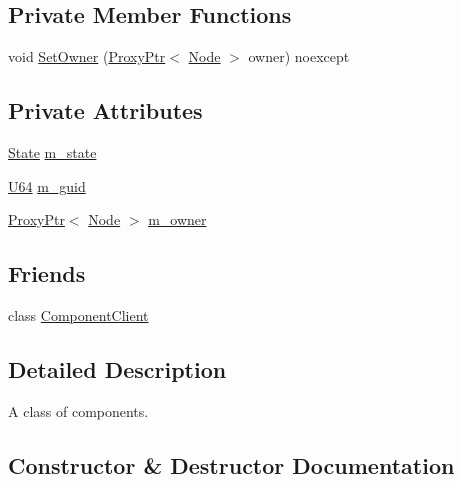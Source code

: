 \subsection*{Private Member Functions}
\begin{DoxyCompactItemize}
\item 
void \hyperlink{classmage_1_1_component_aed5c7f7af79357f708c71572d7d99638}{Set\+Owner} (\hyperlink{classmage_1_1_proxy_ptr}{Proxy\+Ptr}$<$ \hyperlink{classmage_1_1_node}{Node} $>$ owner) noexcept
\end{DoxyCompactItemize}
\subsection*{Private Attributes}
\begin{DoxyCompactItemize}
\item 
\hyperlink{namespacemage_ae47d13d8477ee94893b9a3947d28eebc}{State} \hyperlink{classmage_1_1_component_a541a035d18f4d9f3873996716a8192d5}{m\+\_\+state}
\item 
\hyperlink{namespacemage_a6672cf3c861707ce4a3235a3eb43941d}{U64} \hyperlink{classmage_1_1_component_a3ddfe848bbd16a86dbdfd2717c0618da}{m\+\_\+guid}
\item 
\hyperlink{classmage_1_1_proxy_ptr}{Proxy\+Ptr}$<$ \hyperlink{classmage_1_1_node}{Node} $>$ \hyperlink{classmage_1_1_component_ad32770e1f30112cebd2894c1e976a4a7}{m\+\_\+owner}
\end{DoxyCompactItemize}
\subsection*{Friends}
\begin{DoxyCompactItemize}
\item 
class \hyperlink{classmage_1_1_component_a12f171c7a6bd27671b33ad16b0e42a6a}{Component\+Client}
\end{DoxyCompactItemize}


\subsection{Detailed Description}
A class of components. 

\subsection{Constructor \& Destructor Documentation}
\hypertarget{classmage_1_1_component_a2326c6df733b0cabf3086ad4187ba607}{}\label{classmage_1_1_component_a2326c6df733b0cabf3086ad4187ba607} 
